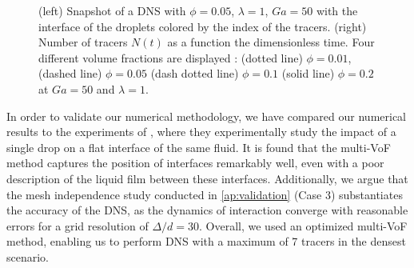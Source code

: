 \begin{figure}[h!]
    \centering
    \caption{
    (left) Snapshot of a DNS with $\phi = 0.05$, $\lambda = 1$, $Ga = 50$ with the interface of the droplets colored by the index of the tracers.
    (right) Number of tracers $N(t)$ as a function the dimensionless time.
    Four different volume fractions are displayed : (dotted line) $\phi = 0.01$, (dashed line) $\phi = 0.05$ (dash dotted line) $\phi = 0.1$ (solid line) $\phi = 0.2$ at $Ga = 50$ and $\lambda = 1$. 
    }
    \label{fig:diagram}
\end{figure}


In order to validate our numerical methodology, we have compared our numerical results to the experiments of \citet{mohamed2003drop}, where they experimentally study the impact of a single drop on a flat interface of the same fluid. %
It is found that the multi-VoF method captures the position of interfaces remarkably well, even with a poor description of the liquid film between these interfaces.
Additionally, we argue that the mesh independence study conducted in \ref{ap:validation} (Case 3) substantiates the accuracy of the DNS, as the dynamics of interaction converge with reasonable errors for a grid resolution of $\Delta/d = 30$. 
Overall, we used an optimized multi-VoF method, enabling us to perform DNS with a maximum of 7 tracers in the densest scenario. 





